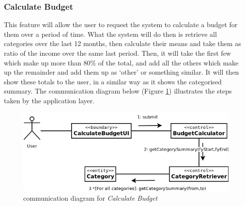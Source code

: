 \subsubsection{Calculate Budget} \label{sec:AnalysisAndDesign.BusinessLogic.CalculateBudget}
This feature will allow the user to request the system to calculate a budget
for them over a period of time. What the system will do then is retrieve all
categories over the last 12 months, then calculate their means and take them as
ratio of the income over the same last period. Then, it will take the first few
which make up more than 80\% of the total, and add all the others which make up
the remainder and add them up as `other' or something similar. It will then
show these totals to the user, in a similar way as it shows the categorised
summary. The communication diagram below (Figure
\ref{fig:CommDiagram.CalculateBudget}) illustrates the steps taken by the
application layer.

\begin{figure}[ht!]
  \begin{center}
    \includegraphics[width=14cm]{./contents/img/Comm_Diagram_-_Calculate_Budget.png}
  \end{center}
  \caption{communication diagram for \emph{Calculate Budget}}
  \label{fig:CommDiagram.CalculateBudget}
\end{figure}
\FloatBarrier


